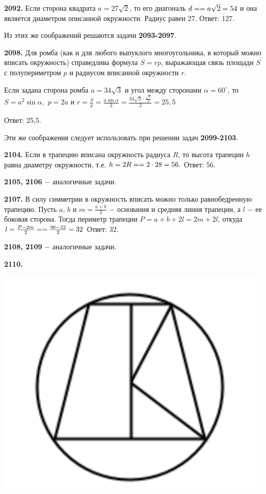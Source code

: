 \textbf{2092.} Если сторона квадрата $a = 27\sqrt{2}$, то его диагональ $d=\linebreak=a\sqrt{2}=54$ и она является диаметром описанной окружности. Радиус равен 27. \newline \null \hspace*{\fill} Ответ: 127.

Из этих же  соображений решаются задачи \textbf{2093-2097}.

\textbf{2098.} Для ромба (как и для любого выпуклого многоугольника, в который можно вписать окружность) справедлива формула $S = rp$, выражающая связь площади $S$ с полупериметром $p$ и радиусом вписанной окружности $r$.

Если задана сторона ромба $a=34\sqrt{3}$ и угол между сторонами $\alpha = 60^\circ$, то $S = a^2 \sin{\alpha},$ $p = 2a$ и $r = \frac{S}{p} = \frac{a\sin{\alpha}}{2}=\frac{34\sqrt{3}\cdot\frac{\sqrt{3}}{2}}{2} = 25,5$

\null \hspace*{\fill} Ответ: 25,5.

 Эти же соображения следует использовать при решении задач \textbf{2099-2103}.
 
 \textbf{2104.} Если в трапецию вписана окружность радиуса $R$, то высота трапеции $h$ равна диаметру окружности, т.е. $h = 2R = \linebreak = 2\cdot28 = 56.$ \newline \null \hspace*{\fill} Ответ: 56.
 
\textbf{2105, 2106} $-$ аналогичные задачи.

\textbf{2107.}  В силу симметрии в окружность вписать можно только равнобедренную трапецию. Пусть $a$, $b$ и $m = \frac{a+b}{2}$ $-$ основания и средняя линия трапеции, а $l$ $-$ ее боковая сторона. Тогда периметр трапеции $P = a + b+2l = 2m+2l$, откуда $l = \frac{P-2m}{2}=\linebreak =\frac{96-32}{2}=32$ \newline \null \hspace*{\fill} Ответ: 32.

\textbf{2108, 2109} $-$ аналогичные задачи.

\clearpage
\textbf{2110.}

{\centering \includegraphics[width=0.35\linewidth]{Geometry/Content/40.png}
	
}

